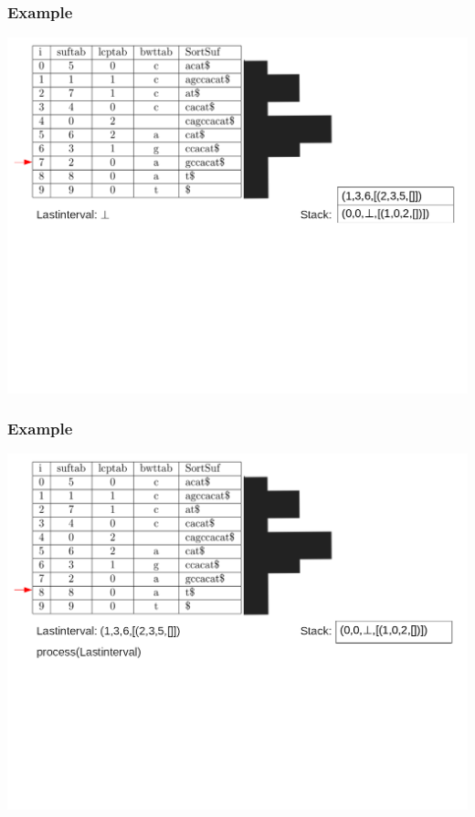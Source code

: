 \documentclass[compress,handout]{beamer} %
\begin{document}
\begin{frame}
	\frametitle{Example}
	\includegraphics[width=\textwidth, height=\textheight, keepaspectratio=true]{traversal_11}
\end{frame}

\begin{frame}
	\frametitle{Example}
	\includegraphics[width=\textwidth, height=\textheight, keepaspectratio=true]{traversal_12}
\end{frame}
\end{document}
